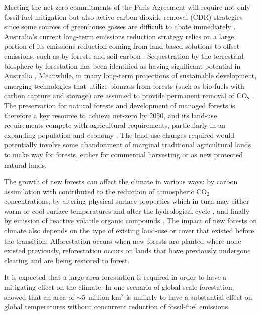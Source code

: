 \documentclass[]{article}
\begin{document}
Meeting the net-zero commitments of the Paris Agreement will require not only fossil fuel mitigation but also active carbon dioxide removal (CDR) strategies since some sources of greenhouse gasses are difficult to abate immediately \parencite{van_vuuren_rcp26_2011, vaughan_review_2011, rogelj_emission_2011}.
Australia's current long-term emissions reduction strategy relies on a large portion of its emissions reduction coming from land-based solutions to offset emissions, such as by forests and soil carbon \parencite{smith_longterm_2022, australian_government_2021}.
Sequestration by the terrestrial biosphere by forestation has been identified as having significant potential in Australia \parencite{fitch_australias_2022}.
Meanwhile, in many long-term projections of sustainable development, emerging technologies that utilize biomass from forests (such as bio-fuels with carbon capture and storage) are assumed to provide permanent removal of CO$_2$ \parencite{pour_opportunities_2018}.
The preservation for natural forests and development of managed forests is therefore a key resource to achieve net-zero by 2050, and its land-use requirements compete with agricultural requirements, particularly in an expanding population and economy \parencite{fitch_australias_2022}.
The land-use changes required would potentially involve some abandonment of marginal traditional agricultural lands to make way for forests, either for commercial harvesting or as new protected natural lands.

The growth of new forests can affect the climate in various ways: by carbon assimilation with contributed to the reduction of atmospheric CO$_2$ concentrations, by altering physical surface properties which in turn may either warm or cool surface temperatures and alter the hydrological cycle \parencite{pongratz_biogeophysical_2010}, and finally by emission of reactive volatile organic compounds \parencite{weber_chemistry_albedo_2024}. The impact of new forests on climate also depends on the type of existing land-use or cover that existed before the transition. Afforestation occurs when new forests are planted where none existed previously, reforestation occurs on lands that have previously undergone clearing and are being restored to forest.

It is expected that a large area forestation is required in order to have a mitigating effect on the climate.
In one scenario of global-scale forestation, \cite{loughran_limited_2023} showed that an area of $\sim$5 million km$^2$ is unlikely to have a substantial effect on global temperatures without concurrent reduction of fossil-fuel emissions.
\end{document}
